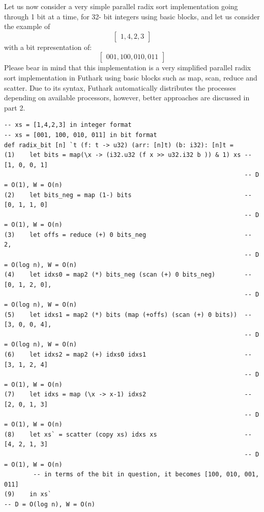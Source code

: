 \documentclass{article}
\begin{document}
\begin{itemize}
Let us now consider a very simple parallel radix sort implementation going through 1 bit at a time, for 32- bit integers using basic blocks, and let us consider the example of
$$\begin{bmatrix} 1, 4, 2, 3\end{bmatrix}$$
with a bit representation of: 
$$\begin{bmatrix} 001, 100, 010, 011\end{bmatrix}$$
Please bear in mind that this implementation is a very simplified parallel radix sort implementation in Futhark using basic blocks such as map, scan, reduce and scatter. Due to its syntax, Futhark automatically distributes the processes depending on available processors, however, better approaches are discussed in part 2. 
\begin{lstlisting}
-- xs = [1,4,2,3] in integer format
-- xs = [001, 100, 010, 011] in bit format 
def radix_bit [n] `t (f: t -> u32) (arr: [n]t) (b: i32): [n]t =
(1)    let bits = map(\x -> (i32.u32 (f x >> u32.i32 b )) & 1) xs -- [1, 0, 0, 1]
                                                                  -- D = O(1), W = O(n)
(2)    let bits_neg = map (1-) bits                               -- [0, 1, 1, 0]
                                                                  -- D = O(1), W = O(n)
(3)    let offs = reduce (+) 0 bits_neg                           -- 2, 
                                                                  -- D = O(log n), W = O(n)
(4)    let idxs0 = map2 (*) bits_neg (scan (+) 0 bits_neg)        -- [0, 1, 2, 0],
                                                                  -- D = O(log n), W = O(n)
(5)    let idxs1 = map2 (*) bits (map (+offs) (scan (+) 0 bits))  -- [3, 0, 0, 4], 
                                                                  -- D = O(log n), W = O(n)
(6)    let idxs2 = map2 (+) idxs0 idxs1                           -- [3, 1, 2, 4]
                                                                  -- D = O(1), W = O(n)
(7)    let idxs = map (\x -> x-1) idxs2                           -- [2, 0, 1, 3]
                                                                  -- D = O(1), W = O(n)
(8)    let xs` = scatter (copy xs) idxs xs                        -- [4, 2, 1, 3]
                                                                  -- D = O(1), W = O(n)
        -- in terms of the bit in question, it becomes [100, 010, 001, 011]
(9)    in xs`                                                                                                                                -- D = O(log n), W = O(n)


\end{lstlisting}
\end{itemize}
\end{document}
